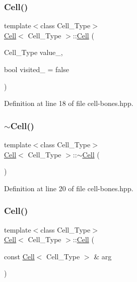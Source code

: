 \mbox{\label{class_cell_a6592b5fcfc80001c8de64a2e722ca715}} 
\subsubsection{\texorpdfstring{Cell()}{Cell()}\hspace{0.1cm}{\footnotesize\ttfamily [2/12]}}
{\footnotesize\ttfamily template$<$class Cell\+\_\+\+Type$>$ \\
\hyperlink{class_cell}{Cell}$<$ Cell\+\_\+\+Type $>$\+::\hyperlink{class_cell}{Cell} (\begin{DoxyParamCaption}\item[{Cell\+\_\+\+Type}]{value\+\_\+,  }\item[{bool}]{visited\+\_\+ = {\ttfamily false} }\end{DoxyParamCaption})\hspace{0.3cm}{\ttfamily [inline]}}



Definition at line 18 of file cell-\/bones.\+hpp.

\mbox{\label{class_cell_a12667d768c7eab9e295b3476a5d60c0e}} 
\subsubsection{\texorpdfstring{$\sim$\+Cell()}{~Cell()}}
{\footnotesize\ttfamily template$<$class Cell\+\_\+\+Type$>$ \\
\hyperlink{class_cell}{Cell}$<$ Cell\+\_\+\+Type $>$\+::$\sim$\hyperlink{class_cell}{Cell} (\begin{DoxyParamCaption}{ }\end{DoxyParamCaption})\hspace{0.3cm}{\ttfamily [inline]}}



Definition at line 20 of file cell-\/bones.\+hpp.

\mbox{\label{class_cell_a667a3060f565f033a62038500e81342d}} 
\subsubsection{\texorpdfstring{Cell()}{Cell()}\hspace{0.1cm}{\footnotesize\ttfamily [3/12]}}
{\footnotesize\ttfamily template$<$class Cell\+\_\+\+Type$>$ \\
\hyperlink{class_cell}{Cell}$<$ Cell\+\_\+\+Type $>$\+::\hyperlink{class_cell}{Cell} (\begin{DoxyParamCaption}\item[{const \hyperlink{class_cell}{Cell}$<$ Cell\+\_\+\+Type $>$ \&}]{arg }\end{DoxyParamCaption})\hspace{0.3cm}{\ttfamily [inline]}}



